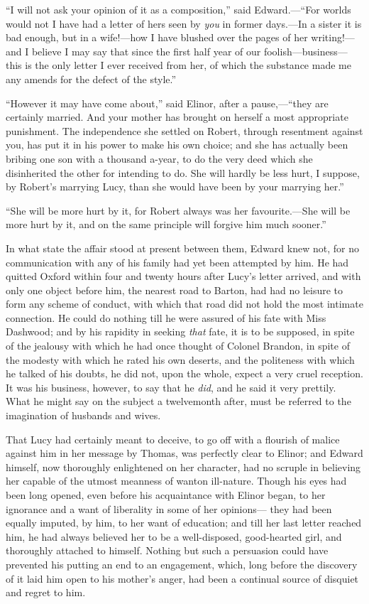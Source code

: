 \documentclass{article}
\begin{document}
``I will not ask your opinion of it as a composition,''
said Edward.---``For worlds would not I have had a letter
of hers seen by \emph{you} in former days.---In a sister it
is bad enough, but in a wife!---how I have blushed over
the pages of her writing!---and I believe I may say that
since the first half year of our foolish---business---this
is the only letter I ever received from her, of which
the substance made me any amends for the defect of the style.''

``However it may have come about,'' said Elinor,
after a pause,---``they are certainly married.  And your mother
has brought on herself a most appropriate punishment.
The independence she settled on Robert, through resentment
against you, has put it in his power to make his own choice;
and she has actually been bribing one son with a thousand
a-year, to do the very deed which she disinherited the
other for intending to do.  She will hardly be less hurt,
I suppose, by Robert's marrying Lucy, than she would have
been by your marrying her.''

``She will be more hurt by it, for Robert always
was her favourite.---She will be more hurt by it,
and on the same principle will forgive him much sooner.''

In what state the affair stood at present between them,
Edward knew not, for no communication with any of his family
had yet been attempted by him.  He had quitted Oxford
within four and twenty hours after Lucy's letter arrived,
and with only one object before him, the nearest road
to Barton, had had no leisure to form any scheme of conduct,
with which that road did not hold the most intimate connection.
He could do nothing till he were assured of his fate with
Miss Dashwood; and by his rapidity in seeking \emph{that} fate,
it is to be supposed, in spite of the jealousy with
which he had once thought of Colonel Brandon, in spite
of the modesty with which he rated his own deserts,
and the politeness with which he talked of his doubts,
he did not, upon the whole, expect a very cruel reception.
It was his business, however, to say that he \emph{did}, and he
said it very prettily.  What he might say on the subject
a twelvemonth after, must be referred to the imagination
of husbands and wives.

That Lucy had certainly meant to deceive, to go off
with a flourish of malice against him in her message
by Thomas, was perfectly clear to Elinor; and Edward himself,
now thoroughly enlightened on her character, had no
scruple in believing her capable of the utmost meanness
of wanton ill-nature. Though his eyes had been long opened,
even before his acquaintance with Elinor began, to her
ignorance and a want of liberality in some of her opinions---%
they had been equally imputed, by him, to her want
of education; and till her last letter reached him,
he had always believed her to be a well-disposed,
good-hearted girl, and thoroughly attached to himself.
Nothing but such a persuasion could have prevented
his putting an end to an engagement, which, long before
the discovery of it laid him open to his mother's anger,
had been a continual source of disquiet and regret to him.
\end{document}
